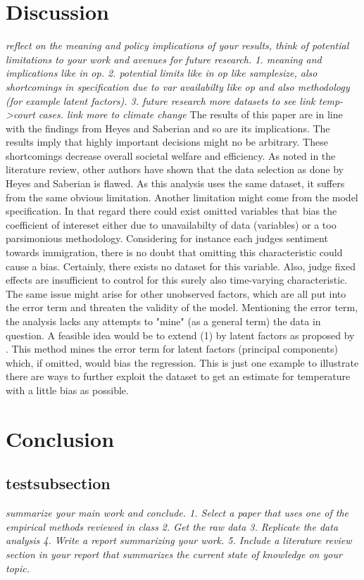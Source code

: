 \documentclass[11pt]{article}
\begin{document}
	\section{Discussion}
	\textit{reflect on the meaning and policy implications of your results, think of potential limitations to your work and avenues for future research.
		1. meaning and implications like in op. 
		2. potential limits like in op like samplesize, also shortcomings in specification due to var availabilty like op and also methodology (for example latent factors).
		3. future research more datasets to see link temp->court cases. link more to climate change
	}
	The results of this paper are in line with the findings from Heyes and Saberian and so are its implications. The results imply that highly important decisions might no be arbitrary. These shortcomings decrease overall societal welfare and efficiency. 
	As noted in the literature review, other authors have shown that the data selection as done by Heyes and Saberian is flawed. As this analysis uses the same dataset, it suffers from the same obvious limitation. Another limitation might come from the model specification. In that regard there could exist omitted variables that bias the coefficient of intereset either due to unavailabilty of data (variables) or a too parsimonious methodology. Considering for instance each judges sentiment towards immigration, there is no doubt that omitting this characteristic could cause a bias. Certainly, there exists no dataset for this variable. Also, judge fixed effects are insufficient to control for this surely also time-varying characteristic. The same issue might arise for other unobserved factors, which are all put into the error term and threaten the validity of the model. Mentioning the error term, the analysis lacks any attempts to "mine" (as a general term) the data in question. A feasible idea would be to extend (1) by latent factors as proposed by \cite{bai2009panel}. This method mines the error term for latent factors (principal components) which, if omitted, would bias the regression. This is just one example to illustrate there are ways to further exploit the dataset to get an estimate for temperature with a little bias as possible. 
	\section{ Conclusion}
	\subsection{testsubsection}
	\textit{	summarize your main work and conclude.
		1. Select a paper that uses one of the empirical methods reviewed in class
		2. Get the raw data
		3. Replicate the data analysis
		4. Write a report summarizing your work.
		5. Include a literature review section in your report that summarizes the current state
		of knowledge on your topic.
	}
\end{document}
